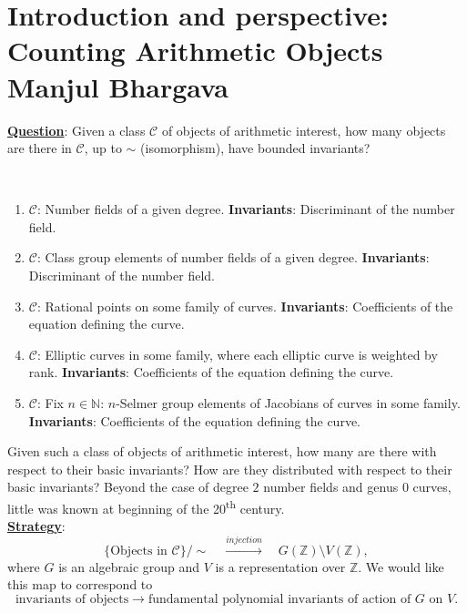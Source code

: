 \chapter{Introduction and perspective:  Counting Arithmetic Objects \\ Manjul Bhargava}\label{ch:1}

\noindent \underline{\textbf{Question}}:  Given a class $\mathscr{C}$ of objects of arithmetic interest, how many objects are there in $\mathscr{C}$, up to $\sim$ (isomorphism), have bounded invariants?
\begin{examples}
{\ }
\begin{enumerate}
\item $\mathscr{C}$:  Number fields of a given degree.  \textbf{Invariants}:  Discriminant of the number field.
\item $\mathscr{C}$:  Class group elements of number fields of a given degree.  \textbf{Invariants}:  Discriminant of the number field.
\item $\mathscr{C}$:  Rational points on some family of curves.  \textbf{Invariants}:  Coefficients of the equation defining the curve.
\item $\mathscr{C}$:  Elliptic curves in some family, where each elliptic curve is weighted by rank.  \textbf{Invariants}:  Coefficients of the equation defining the curve.
\item $\mathscr{C}$:  Fix $n \in \mathbb{N}$:  $n$-Selmer group elements of Jacobians of curves in some family.  \textbf{Invariants}:  Coefficients of the equation defining the curve.
\end{enumerate}
\end{examples}
Given such a class of objects of arithmetic interest, how many are there with respect to their basic invariants?  How are they distributed with respect to their basic invariants?  Beyond the case of degree $2$ number fields and genus $0$ curves, little was known at beginning of the 20\textsuperscript{th} century.\\
\indent \underline{\textbf{Strategy}}:
\begin{equation*}
\{\text{Objects in } \mathscr{C}\}/\sim \quad \xrightarrow{injection} \quad G(\mathbb{Z})\setminus V(\mathbb{Z}),
\end{equation*}
where $G$ is an algebraic group and $V$ is a representation over $\mathbb{Z}$.  We would like this map to correspond to
\begin{equation*}
\text{invariants of objects} \to \text{fundamental polynomial invariants of action of } G \text{ on } V.
\end{equation*}
